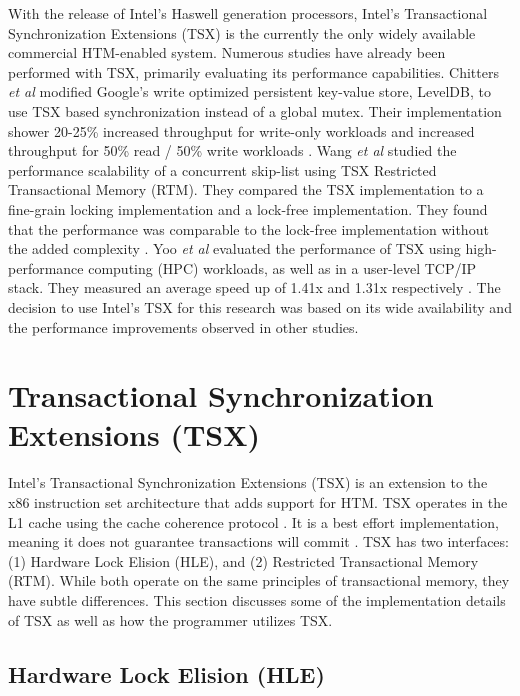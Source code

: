 \documentclass[11pt]{book}
\begin{document}
With the release of Intel's Haswell generation processors, Intel's Transactional
Synchronization Extensions (TSX) is the currently the only widely available commercial
HTM-enabled system.  Numerous studies have already been performed with TSX, primarily
evaluating its performance capabilities.  Chitters \emph{et al} modified Google's write
optimized persistent key-value store, LevelDB, to use TSX based synchronization instead of
a global mutex.  Their implementation shower 20-25\% increased throughput for write-only
workloads and increased throughput for 50\% read / 50\% write workloads
\cite{chitters_tsx}.  Wang \emph{et al} studied the performance scalability of a
concurrent skip-list using TSX Restricted Transactional Memory (RTM).  They compared the
TSX implementation to a fine-grain locking implementation and a lock-free implementation.
They found that the performance was comparable to the lock-free implementation without the
added complexity \cite{wang_tsx}.  Yoo \emph{et al} evaluated the performance of TSX using
high-performance computing (HPC) workloads, as well as in a user-level TCP/IP stack.  They
measured an average speed up of 1.41x and 1.31x respectively \cite{yoo_tsx}.  The decision
to use Intel's TSX for this research was based on its wide availability and the
performance improvements observed in other studies.

\section{Transactional Synchronization Extensions (TSX)}

Intel's Transactional Synchronization Extensions (TSX) is an extension to the x86
instruction set architecture that adds support for HTM.  TSX operates in the L1 cache
using the cache coherence protocol \cite{intel_opt_man}.  It is a best effort
implementation, meaning it does not guarantee transactions will commit
\cite{intel_prog_ref}.  TSX has two interfaces: (1) Hardware Lock Elision (HLE), and (2)
Restricted Transactional Memory (RTM).  While both operate on the same principles of
transactional memory, they have subtle differences.  This section discusses some of the
implementation details of TSX as well as how the programmer utilizes TSX.

\subsection{Hardware Lock Elision (HLE)}\label{sec:hle}
\end{document}
